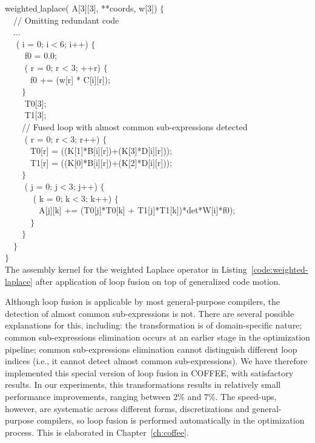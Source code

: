 \begin{algorithm}
\scriptsize\ttfamily
{}
 weighted$\_$laplace( A[3][3],  **coords,  w[3]) $\lbrace$\\
~~// Omitting redundant code \\
~~...\\
~~ ( i = 0; i$<$6; i++) $\lbrace$ \\
~~~~ f0  = 0.0;\\
~~~~ ( r  = 0; r < 3; ++r) $\lbrace$ \\
~~~~~~f0 += (w[r] * C[i][r]);\\
~~~~$\rbrace$ \\
~~~~ T0[3];\\
~~~~ T1[3];\\
~~~~// Fused loop with almost common sub-expressions detected\\
~~~~ ( r = 0; r$<$3; r++) $\lbrace$ \\
~~~~~~T0[r] = ((K[1]*B[i][r])+(K[3]*D[i][r]));\\
~~~~~~T1[r] = ((K[0]*B[i][r])+(K[2]*D[i][r]));\\
~~~~$\rbrace$\\
~~~~ ( j = 0; j$<$3; j++) $\lbrace$\\
~~~~~~ ( k = 0; k$<$3; k++) $\lbrace$\\
~~~~~~~~A[j][k] += (T0[j]*T0[k] + T1[j]*T1[k])*det*W[i]*f0);\\
~~~~~~$\rbrace$\\
~~~~$\rbrace$\\
~~$\rbrace$\\
$\rbrace$\\
\caption{The assembly kernel for the weighted Laplace operator in Listing~\ref{code:weighted-laplace} after application of loop fusion on top of generalized code motion.}
\label{code:weighted-laplace-loopfusion}
\end{algorithm}

Although loop fusion is applicable by most general-purpose compilers, the detection of almost common sub-expressions is not. There are several possible explanations for this, including: the transformation is of domain-specific nature; common sub-expressions elimination occurs at an earlier stage in the optimization pipeline; common sub-expressions elimination cannot distinguish different loop indices (i.e., it cannot detect almost common sub-expressions). We have therefore implemented this special version of loop fusion in COFFEE, with satisfactory results. In our experiments, this transformations results in relatively small performance improvements, ranging between $2\%$ and $7\%$. The speed-ups, however, are systematic across different forms, discretizations and general-purpose compilers, so loop fusion is performed automatically in the optimization process. This is elaborated in Chapter~\ref{ch:coffee}.

